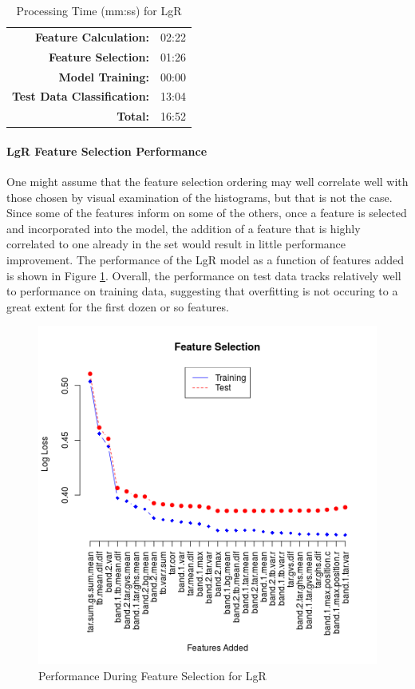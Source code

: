 \documentclass[fleqn,10pt]{SelfArx} %
\begin{document}
\begin{table}[H]
	\centering
	\caption{Processing Time (mm:ss) for LgR}\label{proc-time-lgr}
	\begin{tabular}{r l}
		\toprule
		\textbf{Feature Calculation:} 		& 02:22 \\
		\textbf{Feature Selection:}			& 01:26 \\
		\textbf{Model Training:}			& 00:00  \\
		\textbf{Test Data Classification:}	& 13:04 \\
		\textbf{Total:}						& 16:52
	\end{tabular}
\end{table}



\paragraph{LgR Feature Selection Performance}
One might assume that the feature selection ordering may well correlate well with those chosen by visual examination of the histograms, but that is not the case.  Since some of the features inform on some of the others, once a feature is selected and incorporated into the model, the addition of a feature that is highly correlated to one already in the set would result in little performance improvement.  The performance of the LgR model as a function of features added is shown in Figure \ref{feat_selection}.  Overall, the performance on test data tracks relatively well to performance on training data, suggesting that overfitting is not occuring to a great extent for the first dozen or so features.

\begin{figure}
	\includegraphics[width=.9\linewidth]{iceberg/feat_sel.png}
	\caption{Performance During Feature Selection for LgR}\label{feat_selection}
\end{figure}
\end{document}
